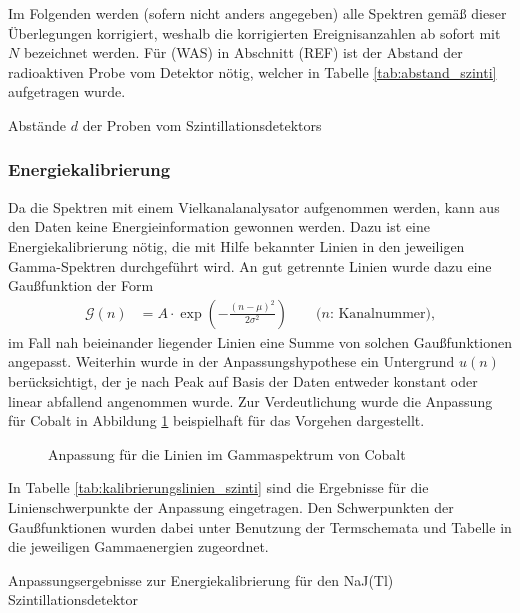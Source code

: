 \documentclass[11pt, a4paper]{article}
\numberwithin{equation}{section}
\begin{document}
Im Folgenden werden (sofern nicht anders angegeben) alle Spektren gemäß dieser Überlegungen korrigiert, weshalb die korrigierten Ereignisanzahlen ab sofort mit $N$ bezeichnet werden.
Für (WAS) in Abschnitt (REF) ist der Abstand der radioaktiven Probe vom Detektor nötig, welcher in Tabelle \ref{tab:abstand_szinti} aufgetragen wurde.
\begin{table}[h]
	\centering
	
	\caption{Abstände $d$ der Proben vom Szintillationsdetektors}
	\label{tab:abstand_szinti}
\end{table}



\subsubsection{Energiekalibrierung}
\label{sec:kalibrierung_szinti}
Da die Spektren mit einem Vielkanalanalysator aufgenommen werden, kann aus den Daten keine Energieinformation gewonnen werden.
Dazu ist eine Energiekalibrierung nötig, die mit Hilfe bekannter Linien in den jeweiligen Gamma-Spektren durchgeführt wird.
An gut getrennte Linien wurde dazu eine Gaußfunktion der Form
\begin{align}
\mathcal{G}(n) &= A \cdot \exp\left( - \frac{(n - \mu)^2}{2 \sigma^2}\right) \qquad\text{($n$: Kanalnummer),}
\label{eq:gaussfithypothese}
\end{align}
im Fall nah beieinander liegender Linien eine Summe von solchen Gaußfunktionen angepasst.
Weiterhin wurde in der Anpassungshypothese ein Untergrund $u(n)$ berücksichtigt, der je nach Peak auf Basis der Daten entweder konstant oder linear abfallend angenommen wurde.
Zur Verdeutlichung wurde die Anpassung für Cobalt in Abbildung \ref{fig:fit_cobalt} beispielhaft für das Vorgehen dargestellt.
\begin{figure}[ht]
	\centering
	
	\caption{Anpassung für die Linien im Gammaspektrum von Cobalt}
	\label{fig:fit_cobalt}
\end{figure}
In Tabelle \ref{tab:kalibrierungslinien_szinti} sind die Ergebnisse für die Linienschwerpunkte der Anpassung eingetragen.
Den Schwerpunkten der Gaußfunktionen wurden dabei unter Benutzung der Termschemata und Tabelle in \cite{anleitung} die jeweiligen Gammaenergien zugeordnet.
\begin{table}[ht]
	\centering
	
	\caption{Anpassungsergebnisse zur Energiekalibrierung für den NaJ(Tl) Szintillationsdetektor}
	\label{tab:kalibrierungslinien_szinti}
\end{table}
\end{document}
